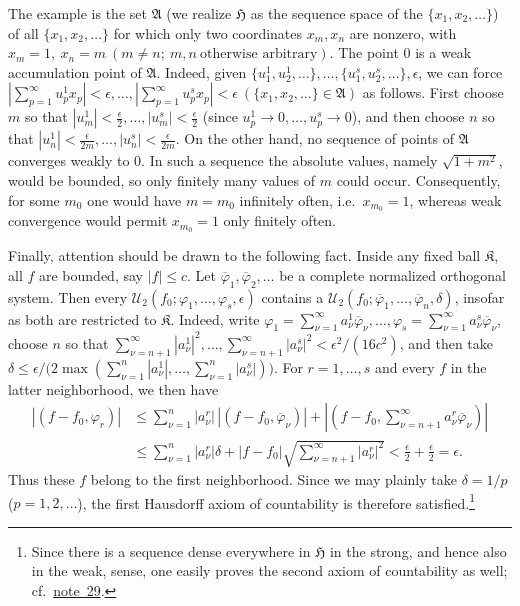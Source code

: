 \documentclass[
  paper=b5,
  twoside=true,
  fontsize=13pt,
  headings=normal,
  bookmarkpackage=false
]{scrartcl}
\theoremstyle{definition}
\newcommand{\NoteRef}[1]{\hyperref[fn:#1]{note~#1}}
\begin{document}
The example is the set $\mathfrak A$ (we realize $\mathfrak H$ as the
sequence space of the $\{x_1,x_2,\ldots\}$) of all $\{x_1,x_2,\ldots\}$ for which only two coordinates $x_m,x_n$ are
nonzero, with $x_m=1,\  x_n=m \ (m\neq n;\ m,n\ \text{otherwise arbitrary})$.
The point $0$ is a weak accumulation point of $\mathfrak A$. Indeed, given $\{u_1^1,u_2^1,\ldots\},\ldots, \{u_1^s,u_2^s,\ldots\},\epsilon$,
we can force $\left|\sum_{p=1}^{\infty}u_p^1x_p\right|<\epsilon, \ldots, \left|\sum_{p=1}^{\infty}u_p^sx_p\right|<\epsilon \ (\{x_1,x_2,\ldots\}\in\mathfrak A)$
as follows. First choose $m$ so that $|u_m^1|<\frac{\epsilon}{2},\ldots, |u_m^s|<\frac{\epsilon}{2}$
(since $u_p^1\to0,\ldots,u_p^s\to0$), and then choose $n$ so that $|u_n^1|<\frac{\epsilon}{2m},\ldots, |u_n^s|<\frac{\epsilon}{2m}$.
On the other hand, no sequence of points of $\mathfrak A$ converges weakly
to $0$. In such a sequence the absolute values, namely $\sqrt{1+m^2}$, would be bounded, so only finitely many values of $m$
could occur. Consequently, for some $m_0$ one would have
$m=m_0$ infinitely often, i.e.\ $x_{m_0}=1$, whereas weak convergence would
permit $x_{m_0}=1$ only finitely often.

Finally, attention should be drawn to the following fact. Inside any fixed
ball $\mathfrak{K}$, all $f$ are bounded, say $|f|\leq c$. Let $\overline\varphi_1,\overline\varphi_2,\ldots$ be a complete normalized
orthogonal system. Then every $\mathcal U_2(f_0;\varphi_1,\ldots,\varphi_s,\epsilon)$
contains a $\mathcal U_2(f_0;\overline\varphi_1,\ldots,\overline\varphi_n,\delta)$,
insofar as both are restricted to $\mathfrak{K}$. Indeed, write $\varphi_1=\sum_{\nu=1}^{\infty}a_\nu^1\overline\varphi_\nu,\ldots,
\varphi_s=\sum_{\nu=1}^{\infty}a_\nu^s\overline\varphi_\nu$,
choose $n$ so that $\sum_{\nu=n+1}^{\infty}|a_\nu^1|^2,\ldots,
\sum_{\nu=n+1}^{\infty}|a_\nu^s|^2<\epsilon^2/(16c^2)$, and then take $\delta\leq\epsilon/\bigl(2\max(\sum_{\nu=1}^n|a_\nu^1|,\ldots,
\sum_{\nu=1}^n|a_\nu^s|)\bigr)$.
For $r=1,\ldots,s$ and every $f$ in the latter neighborhood, we then have
\begin{align*}
 |(f-f_0,\varphi_r)|
 &\leq
 \sum_{\nu=1}^{n}|a_\nu^r|\,
       |(f-f_0,\overline\varphi_\nu)|
 +\left|
   \left(f-f_0,\sum_{\nu=n+1}^{\infty}
       a_\nu^r\overline\varphi_\nu\right)
 \right|\\
 &\leq
 \sum_{\nu=1}^{n}|a_\nu^r|\delta
 +|f-f_0|
 \sqrt{\sum_{\nu=n+1}^{\infty}|a_\nu^r|^2}
 <\frac{\epsilon}{2}+\frac{\epsilon}{2}
 =\epsilon.
\end{align*}
Thus these $f$ belong to the first neighborhood. Since we may plainly take $\delta=1/p$ ($p=1,2,\ldots$), the first Hausdorff axiom of countability is
therefore satisfied.\footnote{\label{fn:33}Since there is a sequence dense everywhere in $\mathfrak H$ in the strong, and hence also in the weak, sense, one easily
proves the second axiom of countability as well; cf.\ \NoteRef{29}.}
\end{document}

